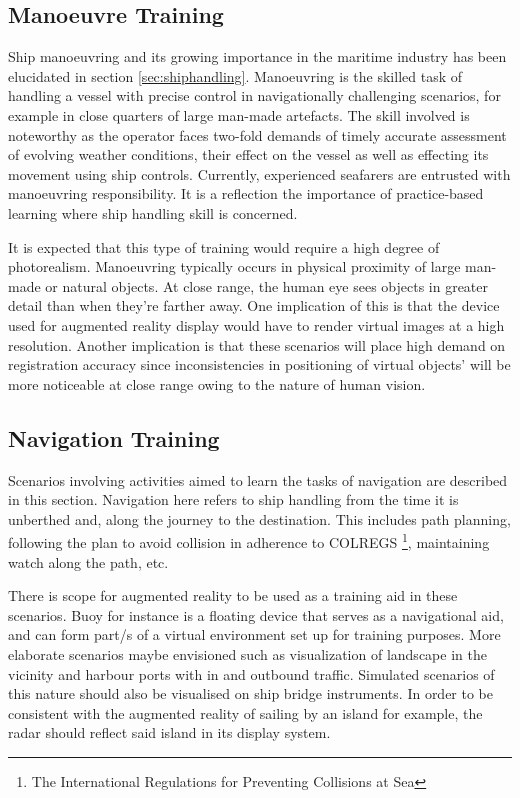 

\subsection{Manoeuvre Training}

Ship manoeuvring and its growing importance in the maritime industry has been elucidated in section \ref{sec:shiphandling}. Manoeuvring is the skilled task of handling a vessel with precise control in navigationally challenging scenarios, for example in close quarters of large man-made artefacts. The skill involved is noteworthy as the operator faces two-fold demands of timely accurate assessment of evolving weather conditions, their effect on the vessel as well as effecting its movement using ship controls. Currently, experienced seafarers are entrusted with manoeuvring responsibility. It is a reflection the importance of practice-based learning where ship handling skill is concerned.  

It is expected that this type of training would require a high degree of photorealism. Manoeuvring typically occurs in physical proximity of large man-made or natural objects. At close range, the human eye sees objects in greater detail than when they're farther away. One implication of this is that the device used for augmented reality display would have to render virtual images at a high resolution. Another implication is that these scenarios will place high demand on registration accuracy since inconsistencies in positioning of virtual objects' will be more noticeable at close range owing to the nature of human vision.

\subsection{Navigation Training}

Scenarios involving activities aimed to learn the tasks of navigation are described in this section. Navigation here refers to ship handling from the time it is unberthed and, along the journey to the destination. This includes path planning, following the plan to avoid collision in adherence to COLREGS \footnote{The International Regulations for Preventing Collisions at Sea}, maintaining watch along the path, etc. 

There is scope for augmented reality to be used as a training aid in these scenarios. Buoy for instance is a floating device that serves as a navigational aid, and can form part/s of a virtual environment set up for training purposes. More elaborate scenarios maybe envisioned such as visualization of landscape in the vicinity and harbour ports with in and outbound traffic. Simulated scenarios of this nature should also be visualised on ship bridge instruments. In order to be consistent with the augmented reality of sailing by an island for example, the radar should reflect said island in its display system. 

